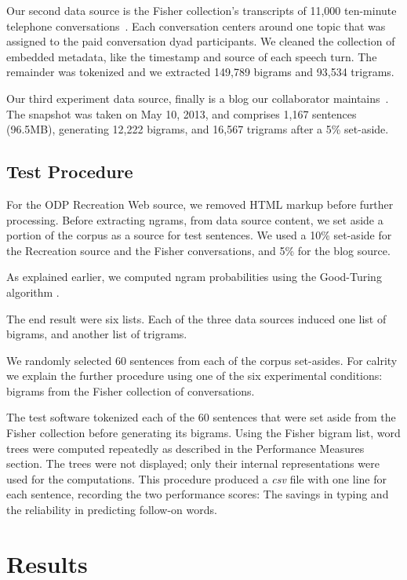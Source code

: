 \documentclass{sigchi}
\begin{document}
Our second data source is the Fisher collection's transcripts of
11,000 ten-minute telephone conversations~\cite{fisher1,fisher2}. Each
conversation centers around one topic that was assigned to the paid
conversation dyad participants. We cleaned the collection of embedded
metadata, like the timestamp and source of each speech turn. The
remainder was tokenized and we extracted 149,789 bigrams and 93,534
trigrams.

Our third experiment data source, finally is a blog our collaborator
maintains~\cite{henryBlog}. The snapshot was taken on May 10, 2013,
and comprises 1,167 sentences (96.5MB), generating 12,222 bigrams, and
16,567 trigrams after a 5\% set-aside.

\subsection{Test Procedure}

For the ODP Recreation Web source, we removed HTML markup before
further processing. Before extracting ngrams, from data source
content, we set aside a portion of the corpus as a source for test
sentences. We used a 10\% set-aside for the Recreation source and the
Fisher conversations, and 5\% for the blog source.

As explained earlier, we computed ngram probabilities using the
Good-Turing algorithm \cite{Gale95good-turingsmoothing}.

The end result were six lists. Each of the three data sources induced
one list of bigrams, and another list of trigrams. 

We randomly selected 60 sentences from each of the corpus set-asides.
For calrity we explain the further procedure using one of the six
experimental conditions: bigrams from the Fisher collection of
conversations.

The test software tokenized each of the 60 sentences that were set
aside from the Fisher collection before generating its bigrams. Using
the Fisher bigram list, word trees were computed repeatedly as
described in the Performance Measures section. The trees were not
displayed; only their internal representations were used for the
computations. This procedure produced a {\em csv} file with one line
for each sentence, recording the two performance scores: The savings
in typing and the reliability in predicting follow-on words.

\section{Results}
\end{document}
